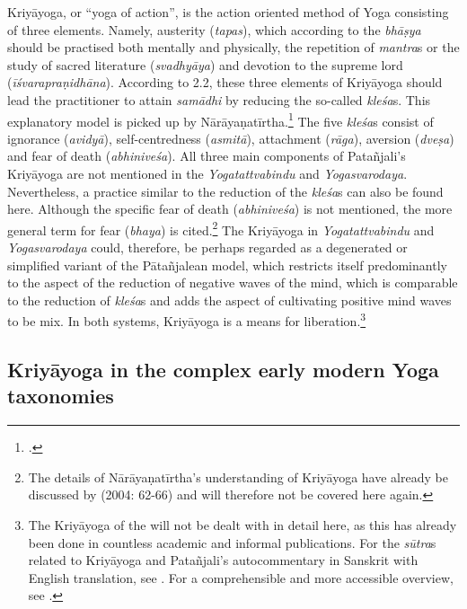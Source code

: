 Kriyāyoga, or ``yoga of action'', is the action oriented method of Yoga consisting of three elements. Namely, austerity (\textit{tapas}), which according to the \textit{bhāṣya} should be practised both mentally and physically, the repetition of \textit{mantra}s or the study of sacred literature (\textit{svadhyāya}) and devotion to the supreme lord (\textit{īśvarapraṇidhāna}).
According to  2.2, these three elements of Kriyāyoga should lead the practitioner to attain \textit{samādhi} by reducing the so-called \textit{kleśa}s. This explanatory model is picked up by Nārāyaṇatīrtha.\footnote{\citeauthor[2000: 71]{yogacandrika}.} The five \textit{kleśa}s consist of ignorance (\textit{avidyā}), self-centredness (\textit{asmitā}), attachment (\textit{rāga}), aversion (\textit{dveṣa}) and fear of death (\textit{abhiniveśa}). 
All three main components of Patañjali's Kriyāyoga are not mentioned in the \textit{Yogatattvabindu} and \textit{Yogasvarodaya}. Nevertheless, a practice similar to the reduction of the \textit{kleśa}s can also be found here. Although the specific fear of death (\textit{abhiniveśa}) is not mentioned, the more general term for fear (\textit{bhaya}) is cited.\footnote{The details of Nārāyaṇatīrtha's understanding of Kriyāyoga have already be discussed by \citeauthor{penna2004} (2004: 62-66) and will therefore not be covered here again.}
The Kriyāyoga in \textit{Yogatattvabindu} and \textit{Yogasvarodaya} could, therefore, be perhaps regarded as a degenerated or simplified variant of the Pātañjalean model, which restricts itself predominantly to the aspect of the reduction of negative waves of the mind, which is comparable to the reduction of \textit{kleśa}s and adds the aspect of cultivating positive mind waves to be mix. In both systems, Kriyāyoga is a means for liberation.\footnote{The Kriyāyoga of the  will not be dealt with in detail here, as this has already been done in countless academic and informal publications. For the \textit{sūtra}s related to Kriyāyoga and Patañjali's autocommentary in Sanskrit with English translation, see \citeauthor[1983: 113 et seqq.]{yogasutra}. For a comprehensible and more accessible overview, see \citeauthor[2009: 170 et seqq.]{bryant2009}.}

\subsection{Kriyāyoga in the complex early modern Yoga taxonomies}

